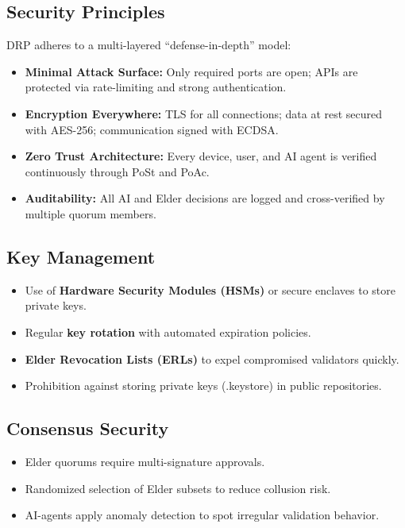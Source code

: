 \documentclass[11pt,a4paper]{article}
\begin{document}
\subsection{Security Principles}
DRP adheres to a multi-layered “defense-in-depth” model:
\begin{itemize}
    \item \textbf{Minimal Attack Surface:} Only required ports are open; APIs are protected via rate-limiting and strong authentication.
    \item \textbf{Encryption Everywhere:} TLS for all connections; data at rest secured with AES-256; communication signed with ECDSA.
    \item \textbf{Zero Trust Architecture:} Every device, user, and AI agent is verified continuously through PoSt and PoAc.
    \item \textbf{Auditability:} All AI and Elder decisions are logged and cross-verified by multiple quorum members.
\end{itemize}

\subsection{Key Management}
\begin{itemize}
    \item Use of \textbf{Hardware Security Modules (HSMs)} or secure enclaves to store private keys.
    \item Regular \textbf{key rotation} with automated expiration policies.
    \item \textbf{Elder Revocation Lists (ERLs)} to expel compromised validators quickly.
    \item Prohibition against storing private keys (.keystore) in public repositories.
\end{itemize}

\subsection{Consensus Security}
\begin{itemize}
    \item Elder quorums require multi-signature approvals.
    \item Randomized selection of Elder subsets to reduce collusion risk.
    \item AI-agents apply anomaly detection to spot irregular validation behavior.
\end{itemize}
\end{document}
